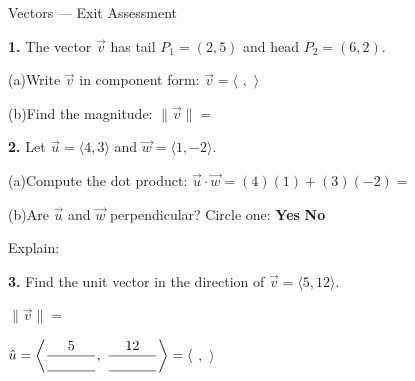 \documentclass[10pt]{article}
\begin{document}
\namedateperiod

\vspace{0.12in}

\begin{notesbox}{Vectors --- Exit Assessment}
\small

\textbf{1.} The vector $\vec{v}$ has tail $P_1 = (2, 5)$ and head $P_2 = (6, 2)$.

\vspace{0.08in}
\hspace{1em} (a)\quad Write $\vec{v}$ in component form: \quad
$\vec{v} = \langle$ \blank{1.5cm}$,$ \blank{1.5cm}$\rangle$

\vspace{0.12in}
\hspace{1em} (b)\quad Find the magnitude: \quad $\|\vec{v}\| = $ \blank{5cm}

\vspace{0.22in}

\textbf{2.} Let $\vec{u} = \langle 4, 3\rangle$ and $\vec{w} = \langle 1, -2\rangle$.

\vspace{0.08in}
\hspace{1em} (a)\quad Compute the dot product: \quad
$\vec{u} \cdot \vec{w} = (4)(1) + (3)(-2) = $ \blank{3cm}

\vspace{0.12in}
\hspace{1em} (b)\quad Are $\vec{u}$ and $\vec{w}$ perpendicular?
Circle one: \quad \textbf{Yes} \quad \textbf{No}

\vspace{0.08in}
\hspace{1em} Explain: \writeline

\vspace{0.22in}

\textbf{3.} Find the unit vector in the direction of $\vec{v} = \langle 5, 12\rangle$.

\vspace{0.08in}
\hspace{1em} $\|\vec{v}\| = $ \blank{4cm}

\vspace{0.12in}
\hspace{1em} $\hat{u} = \left\langle \dfrac{5}{\blank{1.2cm}},\; \dfrac{12}{\blank{1.2cm}} \right\rangle
= \langle$ \blank{2.5cm}$,$ \blank{2.5cm}$\rangle$

\end{notesbox}
\end{document}

